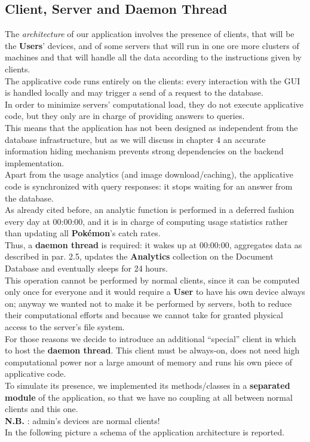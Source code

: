 \subsection{Client, Server and Daemon Thread}
The \textit{architecture} of our application involves the presence of clients, that will be the \textbf{Users}’ devices, and of some servers that will run in one ore more clusters of machines and that will handle all the data according to the instructions given by clients.\\
The applicative code runs entirely on the clients: every interaction with the GUI is handled locally and may trigger a send of a request to the database.\\
In order to minimize servers’ computational load, they do not execute applicative code, but they only are in charge of providing answers to queries.\\
This means that the application has not been designed as independent from the database infrastructure, but as we will discuss in chapter 4 an accurate information hiding mechanism prevents strong dependencies on the backend implementation.\\
Apart from the usage analytics (and image download/caching), the applicative code is synchronized with query responses: it stops waiting for an answer from the database. \medskip \\
As already cited before, an analytic function is performed in a deferred fashion every day at 00:00:00, and it is in charge of computing usage statistics rather than updating all \textbf{Pokémon}’s catch rates. \\
Thus, a \textbf{daemon thread} is required: it wakes up at 00:00:00, aggregates data as described in par. 2.5, updates the \textbf{Analytics} collection on the Document Database and eventually sleeps for 24 hours.\\
This operation cannot be performed by normal clients, since it can be computed only once for everyone and it would require a \textbf{User} to have his own device always on; anyway we wanted not to make it be performed by servers, both to reduce their computational efforts and because we cannot take for granted physical access to the server’s file system. \medskip \\

For those reasons we decide to introduce an additional “special” client in which to host the \textbf{daemon thread}. This client must be always-on, does not need high computational power nor a large amount of memory and runs his own piece of applicative code.\\
To simulate its presence, we implemented its methods/classes in a \textbf{separated module} of the application, so that we have no coupling at all between normal clients and this one. \\
\textbf{N.B.} : admin’s devices are normal clients!\\
In the following picture a schema of the application architecture is reported.


